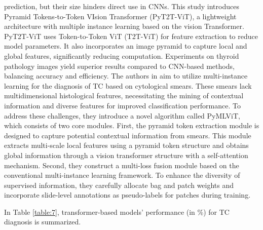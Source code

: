 \documentclass[a4paper,fleqn]{cas-sc}
\begin{document}
prediction, but their size hinders direct use in \acp{CNN}. This study \cite{yin2022pyramid} introduces Pyramid Tokens-to-Token VIsion Transformer (PyT2T-ViT), a lightweight architecture with multiple instance learning based on the vision Transformer. PyT2T-ViT uses Token-to-Token ViT (T2T-ViT) for feature extraction to reduce model parameters. It also incorporates an image pyramid to capture local and global features, significantly reducing computation. Experiments on thyroid pathology images yield superior results compared to CNN-based methods, balancing accuracy and efficiency. The authors in \cite{yu2023pyramid} aim to utilize multi-instance learning for the diagnosis of TC based on cytological smears. These smears lack multidimensional histological features, necessitating the mining of contextual information and diverse features for improved classification performance. To address these challenges, they introduce a novel algorithm called PyMLViT, which consists of two core modules. First, the pyramid token extraction module is designed to capture potential contextual information from smears. This module extracts multi-scale local features using a pyramid token structure and obtains global information through a vision transformer structure with a self-attention mechanism. Second, they construct a multi-loss fusion module based on the conventional multi-instance learning framework. To enhance the diversity of supervised information, they carefully allocate bag and patch weights and incorporate slide-level annotations as pseudo-labels for patches during training.

In Table \ref{table:7}, transformer-based models' performance (in \%) for TC diagnosis is summarized. 
\end{document}
